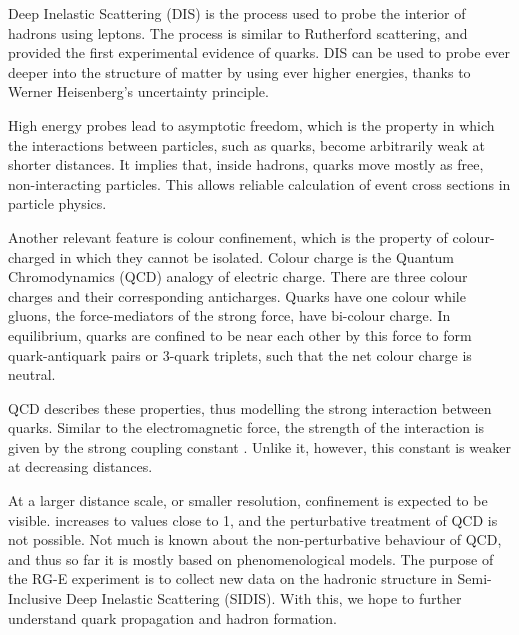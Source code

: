     Deep Inelastic Scattering (DIS) is the process used to probe the interior of hadrons using leptons.
    The process is similar to Rutherford scattering, and provided the first experimental evidence of quarks.
    DIS can be used to probe ever deeper into the structure of matter by using ever higher energies, thanks to Werner Heisenberg's uncertainty principle.

    High energy probes lead to asymptotic freedom, which is the property in which the interactions between particles, such as quarks, become arbitrarily weak at shorter distances.
    It implies that, inside hadrons, quarks move mostly as free, non-interacting particles.
    This allows reliable calculation of event cross sections in particle physics.

    Another relevant feature is colour confinement, which is the property of colour-charged in which they cannot be isolated.
    Colour charge is the Quantum Chromodynamics (QCD) analogy of electric charge.
    There are three colour charges and their corresponding anticharges.
    Quarks have one colour while gluons, the force-mediators of the strong force, have bi-colour charge.
    In equilibrium, quarks are confined to be near each other by this force to form quark-antiquark pairs or 3-quark triplets, such that the net colour charge is neutral.

    QCD describes these properties, thus modelling the strong interaction between quarks.
    Similar to the electromagnetic force, the strength of the interaction is given by the strong coupling constant \textalpha.
    Unlike it, however, this constant is weaker at decreasing distances.

    At a larger distance scale, or smaller resolution, confinement is expected to be visible.
    \textalpha increases to values close to 1, and the perturbative treatment of QCD is not possible.
    Not much is known about the non-perturbative behaviour of QCD, and thus so far it is mostly based on phenomenological models.
    The purpose of the RG-E experiment is to collect new data on the hadronic structure in Semi-Inclusive Deep Inelastic Scattering (SIDIS).
    With this, we hope to further understand quark propagation and hadron formation.

    
    
    
